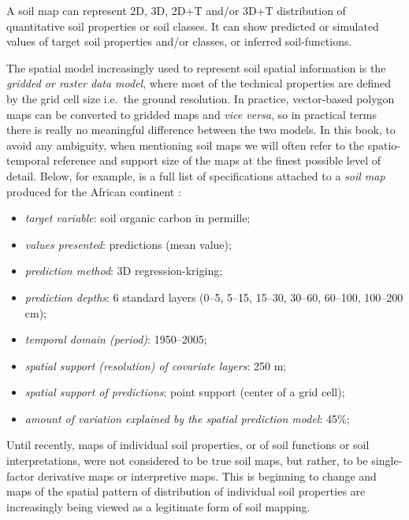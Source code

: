 \documentclass[11pt]{krantz}
\makeatletter
\newenvironment{kframe}{%
\medskip{}
\setlength{\fboxsep}{.8em}
 \def\at@end@of@kframe{}%
 \ifinner\ifhmode%
  \def\at@end@of@kframe{\end{minipage}}%
  \begin{minipage}{\columnwidth}%
 \fi\fi%
 \def\FrameCommand##1{\hskip\@totalleftmargin \hskip-\fboxsep
 \colorbox{shadecolor}{##1}\hskip-\fboxsep
     \hskip-\linewidth \hskip-\@totalleftmargin \hskip\columnwidth}%
 \MakeFramed {\advance\hsize-\width
   \@totalleftmargin\z@ \linewidth\hsize
   \@setminipage}}%
 {\par\unskip\endMakeFramed%
 \at@end@of@kframe}
\newenvironment{rmdblock}[1]
  {
  \begin{itemize}
  \renewcommand{\labelitemi}{
    \raisebox{-.7\height}[0pt][0pt]{
      {\setkeys{Gin}{width=3em,keepaspectratio}\texttt{[image: images/\#1]}}
    }
  }
  \setlength{\fboxsep}{1em}
  \begin{kframe}
  \item
  }
  {
  \end{kframe}
  \end{itemize}
  }
\newenvironment{rmdnote}
  {\begin{rmdblock}{note}}
  {\end{rmdblock}}
\theoremstyle{definition}
\theoremstyle{definition}
\theoremstyle{definition}
\theoremstyle{remark}
\makeatother
\begin{document}
\begin{rmdnote}
A soil map can represent 2D, 3D, 2D+T and/or 3D+T distribution of
quantitative soil properties or soil classes. It can show predicted or
simulated values of target soil properties and/or classes, or inferred
soil-functions.
\end{rmdnote}

The spatial model increasingly used to represent soil spatial
information is the \emph{gridded or raster data model}, where most of
the technical properties are defined by the grid cell size i.e.~the
ground resolution. In practice, vector-based polygon maps can be
converted to gridded maps and \emph{vice versa}, so in practical terms
there is really no meaningful difference between the two models. In this
book, to avoid any ambiguity, when mentioning soil maps we will often
refer to the spatio-temporal reference and support size of the maps at
the finest possible level of detail. Below, for example, is a full list
of specifications attached to a \emph{soil map} produced for the African
continent \citep{Hengl2015AfSoilGrids250m}:

\begin{itemize}
\item
  \emph{target variable}: soil organic carbon in permille;
\item
  \emph{values presented}: predictions (mean value);
\item
  \emph{prediction method}: 3D regression-kriging;
\item
  \emph{prediction depths}: 6 standard layers (0--5, 5--15, 15--30,
  30--60, 60--100, 100--200 cm);
\item
  \emph{temporal domain (period)}: 1950--2005;
\item
  \emph{spatial support (resolution) of covariate layers}: 250 m;
\item
  \emph{spatial support of predictions}: point support (center of a grid
  cell);
\item
  \emph{amount of variation explained by the spatial prediction model}:
  45\%;
\end{itemize}

Until recently, maps of individual soil properties, or of soil functions
or soil interpretations, were not considered to be true soil maps, but
rather, to be single-factor derivative maps or interpretive maps. This
is beginning to change and maps of the spatial pattern of distribution
of individual soil properties are increasingly being viewed as a
legitimate form of soil mapping.
\end{document}
